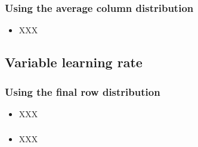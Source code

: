 \documentclass{beamer}
\begin{document}
\begin{frame}
\frametitle{Using the average column distribution}
\begin{itemize}
\item XXX
\end{itemize}
\end{frame}

\subsection{Variable learning rate}
\begin{frame}
\frametitle{Using the final row distribution}
\begin{itemize}
\item XXX
\end{itemize}
\end{frame}

\begin{frame}
\frametitle{}
\begin{itemize}
\item XXX
\end{itemize}
\end{frame}

\fi %
\end{document}
